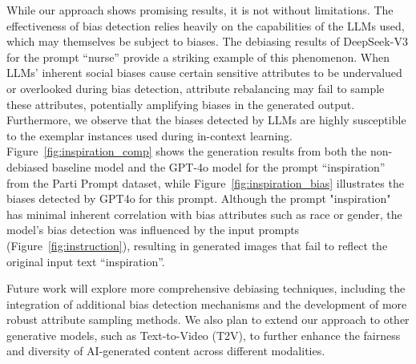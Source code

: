 While our approach shows promising results, it is not without limitations. The effectiveness of bias detection relies heavily on the capabilities of the LLMs used, which may themselves be subject to biases. The debiasing results of DeepSeek-V3 for the prompt ``nurse'' provide a striking example of this phenomenon. When LLMs' inherent social biases cause certain sensitive attributes to be undervalued or overlooked during bias detection, attribute rebalancing may fail to sample these attributes, potentially amplifying biases in the generated output. Furthermore, we observe that the biases detected by LLMs are highly susceptible to the exemplar instances used during in-context learning.
Figure~\ref{fig:inspiration_comp} shows the generation results from both the non-debiased baseline model and the GPT-4o model for the prompt ``inspiration'' from the Parti Prompt dataset, while Figure~\ref{fig:inspiration_bias} illustrates the biases detected by GPT4o for this prompt. Although the prompt "inspiration" has minimal inherent correlation with bias attributes such as race or gender, the model's bias detection was influenced by the input prompts (Figure~\ref{fig:instruction}), resulting in generated images that fail to reflect the original input text ``inspiration''.


Future work will explore more comprehensive debiasing techniques, including the integration of additional bias detection mechanisms and the development of more robust attribute sampling methods. We also plan to extend our approach to other generative models, such as Text-to-Video (T2V), to further enhance the fairness and diversity of AI-generated content across different modalities.
